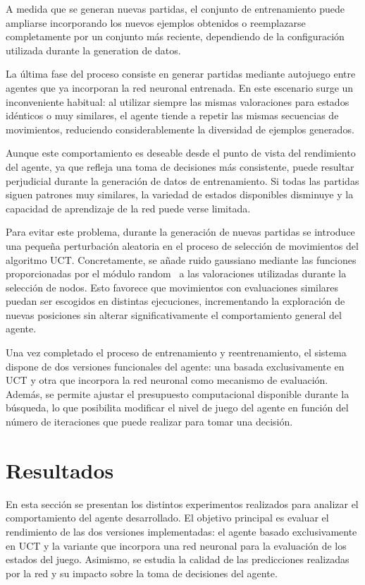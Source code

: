 \documentclass[conference,a4paper]{IEEEtran}
\begin{document}
A medida que se generan nuevas partidas, el conjunto de entrenamiento puede ampliarse incorporando los nuevos ejemplos obtenidos o reemplazarse completamente por un conjunto más reciente, dependiendo de la configuración utilizada durante la generation de datos. 

La última fase del proceso consiste en generar partidas mediante autojuego entre agentes que ya incorporan la red neuronal entrenada. 
En este escenario surge un inconveniente habitual: al utilizar siempre las mismas valoraciones para estados idénticos o muy similares, el agente tiende a repetir las mismas secuencias de movimientos, reduciendo considerablemente la diversidad de ejemplos generados. 

Aunque este comportamiento es deseable desde el punto de vista del rendimiento del agente, ya que refleja una toma de decisiones más consistente, puede resultar perjudicial durante la generación de datos de entrenamiento. 
Si todas las partidas siguen patrones muy similares, la variedad de estados disponibles disminuye y la capacidad de aprendizaje de la red puede verse limitada. 

Para evitar este problema, durante la generación de nuevas partidas se introduce una pequeña perturbación aleatoria en el proceso de selección de movimientos del algoritmo UCT. 
Concretamente, se añade ruido gaussiano mediante las funciones proporcionadas por el módulo random~\cite{b16} a las valoraciones utilizadas durante la selección de nodos. 
Esto favorece que movimientos con evaluaciones similares puedan ser escogidos en distintas ejecuciones, incrementando la exploración de nuevas posiciones sin alterar significativamente el comportamiento general del agente. 

Una vez completado el proceso de entrenamiento y reentrenamiento, el sistema dispone de dos versiones funcionales del agente: una basada exclusivamente en UCT y otra que incorpora la red neuronal como mecanismo de evaluación. 
Además, se permite ajustar el presupuesto computacional disponible durante la búsqueda, lo que posibilita modificar el nivel de juego del agente en función del número de iteraciones que puede realizar para tomar una decisión. 

\section{Resultados} 

En esta sección se presentan los distintos experimentos realizados para analizar el comportamiento del agente desarrollado. 
El objetivo principal es evaluar el rendimiento de las dos versiones implementadas: el agente basado exclusivamente en UCT y la variante que incorpora una red neuronal para la evaluación de los estados del juego. 
Asimismo, se estudia la calidad de las predicciones realizadas por la red y su impacto sobre la toma de decisiones del agente. 
\end{document}
